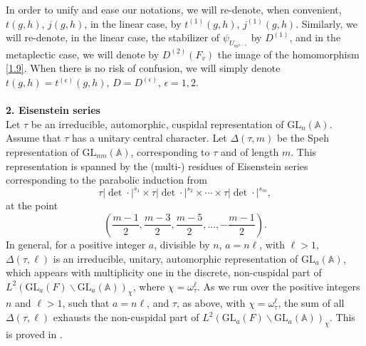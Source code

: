 \documentclass[12pts]{amsart}
\newcommand{\BA}{{\mathbb {A}}}
\newcommand{\GL}{{\mathrm{GL}}}
\begin{document}
In order to unify and ease our notations, we will re-denote, when convenient, $t(g,h)$, $j(g,h)$, in the linear case, by $t^{(1)}(g,h)$, $j^{(1)}(g,h)$. Similarly, we will re-denote, in the linear case, the stabilizer of $\psi_{U_{m^{n-1}}}$ by $D^{(1)}$, and in the metaplectic case, we will denote by $D^{(2)}(F_v)$ the image of the homomorphism \eqref{1.9}. When there is no risk of confusion, we will simply denote $t(g,h)=t^{(\epsilon)}(g,h)$, $D=D^{(\epsilon)}$, $\epsilon=1,2$.\\  
\\
{\bf 2. Eisenstein series}\\

Let $\tau$ be an irreducible, automorphic, cuspidal representation
of $\GL_n(\BA)$. Assume that $\tau$ has a unitary central character.
Let $\Delta(\tau, m)$ be the Speh representation of
$\GL_{nm}(\BA)$, corresponding to $\tau$ and of length $m$. This representation is spanned by the (multi-)
residues of Eisenstein series corresponding to the parabolic induction
from
$$
\tau|\det\cdot|^{s_1}\times
\tau|\det\cdot|^{s_2}\times\cdots\times
\tau|\det\cdot|^{s_m},
$$
at the point
$$
(\frac{m-1}{2},\frac{m-3}{2},\frac{m-5}{2},...,-\frac{m-1}{2}).
$$
In general, for a positive integer $a$, divisible by $n$, $a=n\ell$, with $\ell>1$, $\Delta(\tau,\ell)$ is an irreducible, unitary, automorphic representation of $\GL_a(\BA)$, which appears with multiplicity one in the discrete, non-cuspidal part of $L^2(\GL_a(F)\backslash \GL_a(\BA))_\chi$, where $\chi=\omega_\tau^\ell$. As we run over the positive integers $n$ and $\ell>1$, such that $a=n\ell$, and $\tau$, as above, with $\chi=\omega_\tau^\ell$, the sum of all $\Delta(\tau,\ell)$ exhausts the non-cuspidal part of $L^2(\GL_a(F)\backslash \GL_a(\BA))_\chi$. This is proved in \cite{MW89}.
\end{document}
